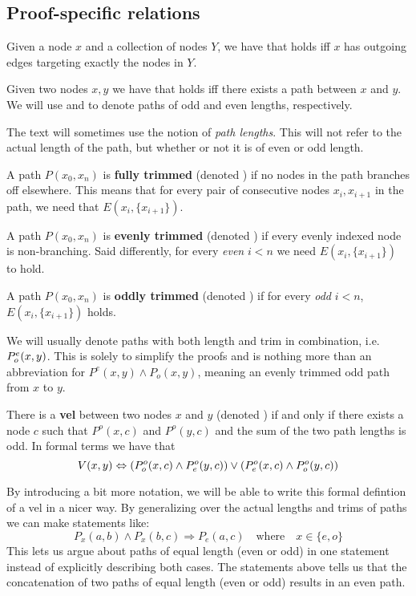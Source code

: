 \subsection{Proof-specific relations}
\label{sub:Proof-specific relations}
\begin{definition}
  Given a node $x$ and a collection of nodes $Y$, we have that  holds iff $x$ has outgoing edges targeting exactly the nodes in $Y$.
\end{definition}
\begin{definition}
  Given two nodes $x,y$ we have that  holds iff there exists a path between $x$ and $y$.
  We will use  and  to denote paths of odd and even lengths, respectively.
\end{definition}
The text will sometimes use the notion of \textit{path lengths}.  This will not refer to the actual length of the path, but whether or not it is of even or odd length.
\begin{definition}
  A path $P(x_0,x_n)$ is \textbf{fully trimmed} (denoted ) if no nodes in the path branches off elsewhere.
  This means that for every pair of consecutive nodes $x_i,x_{i+1}$ in the path, we need that $E(x_i,\{ x_{i+1} \})$.
\end{definition}
\begin{definition}
  A path $P(x_0,x_n)$ is \textbf{evenly trimmed} (denoted ) if every evenly indexed node is non-branching.
  Said differently, for every \textit{even} $i < n$ we need $E(x_i,\{x_{i+1}\})$ to hold.
\end{definition}
\begin{definition}
  A path $P(x_0,x_n)$ is \textbf{oddly trimmed} (denoted ) if for every \textit{odd} $i < n$, $E(x_i,\{x_{i+1}\})$ holds.
\end{definition}
We will usually denote paths with both length and trim in combination, i.e. $P^e_o(x,y)$.
This is solely to simplify the proofs and is nothing more than an abbreviation for $P^e(x,y) \wedge P_o(x,y)$, meaning an evenly trimmed odd path from $x$ to $y$.
\begin{definition}
  There is a \textbf{vel} between two nodes $x$ and $y$ (denoted ) if and only if there exists a node $c$ such that $P^o(x,c)$ and $P^o(y,c)$ and the sum of the two path lengths is odd. In formal terms we have that
  \[
  V(x,y) \Leftrightarrow (P^o_o(x,c) \wedge P^o_e(y,c)) \vee (P^o_e(x,c) \wedge P^o_o(y,c))
  \]
\end{definition}
By introducing a bit more notation, we will be able to write this formal defintion of a vel in a nicer way.
By generalizing over the actual lengths and trims of paths we can make statements like:
\[P_x(a,b) \wedge P_x(b,c) \Rightarrow P_e(a,c) \quad\text{where}\quad x \in \{e,o\}\]
This lets us argue about paths of equal length (even or odd) in one statement instead of explicitly describing both cases.
The statements above tells us that the concatenation of two paths of equal length (even or odd) results in an even path.

